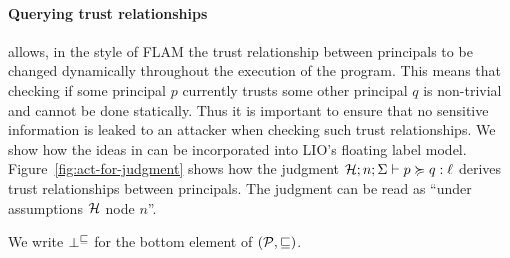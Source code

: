 \paragraph{Querying trust relationships}
\lang{} allows, in the style of FLAM \cite{Arden:2015:FA:2859845.2859998} the trust relationship between principals to be changed dynamically throughout the execution of the program. This means that checking if some principal $p$ currently trusts some other principal $q$ is non-trivial and cannot be done statically. Thus it is important to ensure that no sensitive information is leaked to an attacker when checking such trust relationships. We show how the ideas in \cite{Arden:2015:FA:2859845.2859998} can be incorporated into LIO's floating label model. Figure~\ref{fig:act-for-judgment} shows how the judgment $\mathcal{H}; n; \Sigma \vdash p \succcurlyeq q : \ell$ derives trust relationships between principals. The judgment can be read as ``under assumptions $\mathcal{H}$ node $n$''.

We write $\bot^{\sqsubseteq}$ for the bottom element of $(\mathcal{P}, \sqsubseteq)$.

